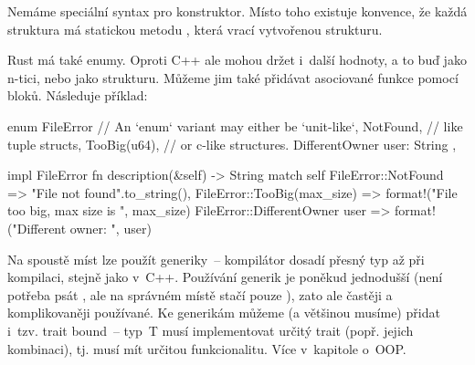 \documentclass[main.tex]{subfiles}
\begin{document}
Nemáme speciální syntax pro konstruktor. Místo toho existuje konvence, že každá struktura
má statickou metodu , která vrací vytvořenou strukturu.

Rust má také enumy. Oproti C++ ale mohou držet i~další hodnoty, a to buď jako n-tici, nebo
jako strukturu. Můžeme jim také přidávat asociované funkce pomocí  bloků.
Následuje příklad:

\obrazek
\begin{rustcode}
    enum FileError {
        // An `enum` variant may either be `unit-like`,
        NotFound,
        // like tuple structs,
        TooBig(u64),
        // or c-like structures.
        DifferentOwner { user: String },
    }

    impl FileError {
        fn description(&self) -> String {
            match self {
                FileError::NotFound => "File not found".to_string(),
                FileError::TooBig(max_size) => {
                    format!("File too big, max size is {}", max_size)
                }
                FileError::DifferentOwner { user } => {
                    format!("Different owner: {}", user)
                }
            }
        }
    }
\end{rustcode}


Na spoustě míst lze použít generiky~-- kompilátor dosadí přesný typ až při kompilaci,
stejně jako v~C++. Používání generik je poněkud jednodušší (není potřeba psát
, ale na správném místě stačí pouze ), zato ale
častěji a komplikovaněji používané. Ke generikám můžeme (a většinou musíme) přidat i~tzv.
trait bound~-- typ~T musí implementovat určitý trait (popř. jejich kombinaci), tj. musí
mít určitou funkcionalitu. Více v~kapitole o~OOP.
\end{document}
